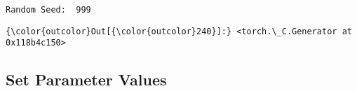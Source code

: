 \documentclass[11pt]{article}
\begin{document}
    \begin{Verbatim}[commandchars=\\\{\},fontsize=\footnotesize]
Random Seed:  999

    \end{Verbatim}

\begin{Verbatim}[commandchars=\\\{\}]
{\color{outcolor}Out[{\color{outcolor}240}]:} <torch.\_C.Generator at 0x118b4c150>
\end{Verbatim}
            
    \subsection{Set Parameter Values}\label{set-parameter-values}
\end{document}
